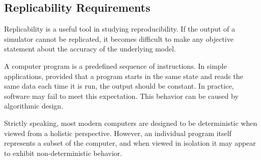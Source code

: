 \documentclass[journal,transmag,twoside]{IEEEtran}
\begin{document}
%
%

\subsection{Replicability Requirements}

Replicability is a useful tool in studying reproducibility.
If the output of a simulator cannot be replicated, it becomes
difficult to make any objective statement about the accuracy of the
underlying model.

A computer program is a predefined sequence of instructions.
In simple applications, provided that a program starts in the same state and reads the same
data each time it is run, the output should be constant.
In practice, software may fail to meet this expectation.
This behavior can be caused by algorithmic design.

Strictly speaking, most modern computers are designed to be deterministic
when viewed from a holistic perspective.
However, an individual program itself represents a subset of the computer,
and when viewed in isolation it may appear to exhibit non-deterministic behavior.
\end{document}
